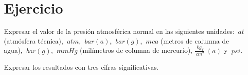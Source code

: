 \section{Ejercicio}\label{ej:Chap01Ejercicio01}
Expresar el valor de la presión atmosférica normal en las siguientes unidades: $\SI{}{at}$ (atmósfera técnica), $\SI{}{atm}$, $\SI{}{bar(a)}$, $\SI{}{bar(g)}$, $\SI{}{mca}$ (metros de columna de agua), $\SI{}{bar(g)}$, $\SI{}{mmHg}$ (milímetros de columna de mercurio), $\frac{\SI{}{kg_f}}{\SI{}{cm^2}}\SI{}{(a)}$ y $\SI{}{psi}$. 

Expresar los resultados con tres cifras significativas.